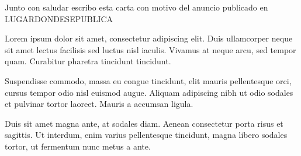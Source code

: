 \documentclass[11pt, a4paper]{awesome-cv}
\begin{document}
\begin{cvletter}


Junto con saludar escribo esta carta con motivo del anuncio publicado en
LUGARDONDESEPUBLICA



Lorem ipsum dolor sit amet, consectetur adipiscing elit. Duis ullamcorper neque sit amet lectus facilisis sed luctus nisl iaculis. Vivamus at neque arcu, sed tempor quam. Curabitur pharetra tincidunt tincidunt.

Suspendisse commodo, massa eu congue tincidunt, elit mauris pellentesque orci, cursus tempor odio nisl euismod augue. Aliquam adipiscing nibh ut odio sodales et pulvinar tortor laoreet. Mauris a accumsan ligula.

Duis sit amet magna ante, at sodales diam. Aenean consectetur porta risus et sagittis. Ut interdum, enim varius pellentesque tincidunt, magna libero sodales tortor, ut fermentum nunc metus a ante.

\end{cvletter}


\end{document}
